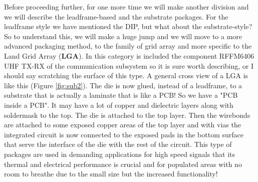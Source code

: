 \documentclass[final]{cubedoc}
\begin{document}
	Before proceeding further, for one more time we will make another division and we will describe the leadframe-based and the substrate packages.
	For the leadframe style we have mentioned the DIP, but what about the substrate-style? So to understand this, we will make a huge jump and we will move to a more advanced packaging method, to the family of grid array and more specific to the Land Grid Array (\textbf{LGA}). In this category is included the component RFFM6406 UHF TX-RX of the communication subsystem so it is sure worth describing, or I should say scratching the surface of this type. A general cross view of a LGA is like this (Figure \ref{fig:sub2}). The die is now glued, instead of a leadframe, to a substrate that is actually a laminate that is like a PCB! So we have a "PCB inside a PCB". It may have a lot of copper and dielectric layers along with soldermask to the top. The die is attached to the top layer. Then the wirebonds are attached to some exposed copper areas of the top layer and with vias the integrated circuit is now connected to the exposed pads in the bottom surface that serve the interface of the die with the rest of the circuit. This type of packages are used in demanding applications for high speed signals that its thermal and electrical performance is crucial and for populated areas with no room to breathe due to the small size but the increased functionality! 
	
\end{document}

